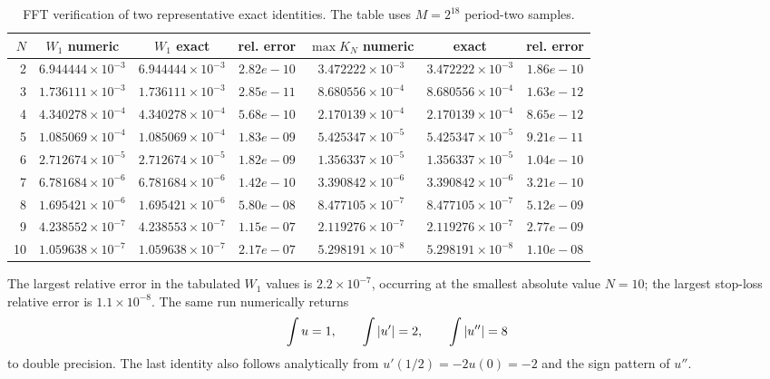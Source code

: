 \documentclass[11pt,oneside]{article}
\numberwithin{equation}{section}
\theoremstyle{definition}
\theoremstyle{remark}
\begin{document}
\begin{table}[htbp]
\centering
\small
\caption{FFT verification of two representative exact identities.  The table uses $M=2^{18}$ period-two samples.}
\label{p5:tab:metric-check}
\setlength{\tabcolsep}{4pt}%
\begin{tabular}{@{}rcccccc@{}}
\toprule
$N$ & $W_1$ numeric & $W_1$ exact & rel. error & $\max K_N$ numeric & exact & rel. error\\
\midrule
2 & $6.944444\times10^{-3}$ & $6.944444\times10^{-3}$ & $2.82e-10$ & $3.472222\times10^{-3}$ & $3.472222\times10^{-3}$ & $1.86e-10$ \\
3 & $1.736111\times10^{-3}$ & $1.736111\times10^{-3}$ & $2.85e-11$ & $8.680556\times10^{-4}$ & $8.680556\times10^{-4}$ & $1.63e-12$ \\
4 & $4.340278\times10^{-4}$ & $4.340278\times10^{-4}$ & $5.68e-10$ & $2.170139\times10^{-4}$ & $2.170139\times10^{-4}$ & $8.65e-12$ \\
5 & $1.085069\times10^{-4}$ & $1.085069\times10^{-4}$ & $1.83e-09$ & $5.425347\times10^{-5}$ & $5.425347\times10^{-5}$ & $9.21e-11$ \\
6 & $2.712674\times10^{-5}$ & $2.712674\times10^{-5}$ & $1.82e-09$ & $1.356337\times10^{-5}$ & $1.356337\times10^{-5}$ & $1.04e-10$ \\
7 & $6.781684\times10^{-6}$ & $6.781684\times10^{-6}$ & $1.42e-10$ & $3.390842\times10^{-6}$ & $3.390842\times10^{-6}$ & $3.21e-10$ \\
8 & $1.695421\times10^{-6}$ & $1.695421\times10^{-6}$ & $5.80e-08$ & $8.477105\times10^{-7}$ & $8.477105\times10^{-7}$ & $5.12e-09$ \\
9 & $4.238552\times10^{-7}$ & $4.238553\times10^{-7}$ & $1.15e-07$ & $2.119276\times10^{-7}$ & $2.119276\times10^{-7}$ & $2.77e-09$ \\
10 & $1.059638\times10^{-7}$ & $1.059638\times10^{-7}$ & $2.17e-07$ & $5.298191\times10^{-8}$ & $5.298191\times10^{-8}$ & $1.10e-08$ \\
\bottomrule
\end{tabular}
\end{table}

The largest relative error in the tabulated $W_1$ values is $2.2\times10^{-7}$, occurring at the smallest absolute value $N=10$; the largest stop-loss relative error is $1.1\times10^{-8}$.  The same run numerically returns
\begin{equation}
 \int u=1,
 \qquad
 \int\left\lvert u'\right\rvert=2,
 \qquad
 \int\left\lvert u''\right\rvert=8
 \label{p5:eq:diagnostics}
\end{equation}
to double precision.  The last identity also follows analytically from $u'(1/2)=-2u(0)=-2$ and the sign pattern of $u''$.
\end{document}
